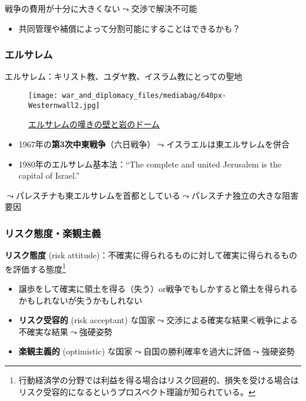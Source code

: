 \documentclass[
  xelatex,
  ja=standard]{bxjsarticle}
\providecommand{\tightlist}{%
  \setlength{\itemsep}{0pt}\setlength{\parskip}{0pt}}\usepackage{longtable,booktabs,array}
\begin{document}
戦争の費用が十分に大きくない\(\leadsto\)交渉で解決不可能

\begin{itemize}
\tightlist
\item
  共同管理や補償によって分割可能にすることはできるかも？
\end{itemize}

\hypertarget{ux30a8ux30ebux30b5ux30ecux30e0}{%
\subsubsection{エルサレム}\label{ux30a8ux30ebux30b5ux30ecux30e0}}

エルサレム：キリスト教、ユダヤ教、イスラム教にとっての聖地

\begin{figure}[htpb]

{\centering \texttt{[image: war\_and\_diplomacy\_files/mediabag/640px-Westernwall2.jpg]}

}

\caption{\href{https://commons.wikimedia.org/wiki/File:Westernwall2.jpg}{エルサレムの嘆きの壁と岩のドーム}}

\end{figure}

\begin{itemize}
\tightlist
\item
  1967年の\textbf{第3次中東戦争}（六日戦争）\(\leadsto\)イスラエルは東エルサレムを併合
\item
  1980年のエルサレム基本法：``The complete and united Jerusalem is the
  capital of Israel.''
\end{itemize}

\(\leadsto\)パレスチナも東エルサレムを首都としている\(\leadsto\)パレスチナ独立の大きな阻害要因

\hypertarget{ux30eaux30b9ux30afux614bux5ea6ux697dux89b3ux4e3bux7fa9}{%
\subsubsection{リスク態度・楽観主義}\label{ux30eaux30b9ux30afux614bux5ea6ux697dux89b3ux4e3bux7fa9}}

\textbf{リスク態度} (risk
attitude)：不確実に得られるものに対して確実に得られるものを評価する態度\footnote{行動経済学の分野では利益を得る場合はリスク回避的、損失を受ける場合はリスク受容的になるというプロスペクト理論が知られている\citep{kahneman2013}。}

\begin{itemize}
\tightlist
\item
  譲歩をして確実に領土を得る（失う）or戦争でもしかすると領土を得られるかもしれないが失うかもしれない
\item
  \textbf{リスク受容的} (risk acceptant)
  な国家\(\leadsto\)交渉による確実な結果＜戦争による不確実な結果\(\leadsto\)強硬姿勢
\item
  \textbf{楽観主義的} (optimistic)
  な国家\(\leadsto\)自国の勝利確率を過大に評価\(\leadsto\)強硬姿勢
\end{itemize}
\end{document}
